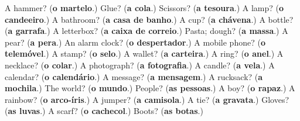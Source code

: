 \begin{tcolorbox}[breakable,colback=teal!4,colframe=teal!35!black,title={Before you move on}]
A hammer? (\textbf{o martelo}.) Glue? (\textbf{a cola}.) Scissors? (\textbf{a tesoura}.) A lamp? (\textbf{o candeeiro}.) A bathroom? (\textbf{a casa de banho}.) A cup? (\textbf{a chávena}.) A bottle? (\textbf{a garrafa}.) A letterbox? (\textbf{a caixa de correio}.) Pasta; dough? (\textbf{a massa}.) A pear? (\textbf{a pera}.) An alarm clock? (\textbf{o despertador}.) A mobile phone? (\textbf{o telemóvel}.) A stamp? (\textbf{o selo}.) A wallet? (\textbf{a carteira}.) A ring? (\textbf{o anel}.) A necklace? (\textbf{o colar}.) A photograph? (\textbf{a fotografia}.) A candle? (\textbf{a vela}.) A calendar? (\textbf{o calendário}.) A message? (\textbf{a mensagem}.) A rucksack? (\textbf{a mochila}.) The world? (\textbf{o mundo}.) People? (\textbf{as pessoas}.) A boy? (\textbf{o rapaz}.) A rainbow? (\textbf{o arco-íris}.) A jumper? (\textbf{a camisola}.) A tie? (\textbf{a gravata}.) Gloves? (\textbf{as luvas}.) A scarf? (\textbf{o cachecol}.) Boots? (\textbf{as botas}.)
\end{tcolorbox}
